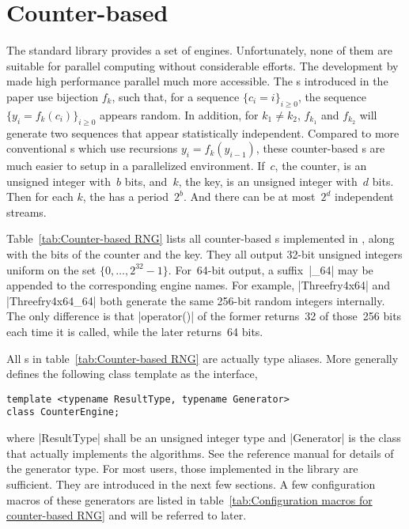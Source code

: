 \section{Counter-based \texorpdfstring{\rng}{RNG}}
\label{sec:Counter-based RNG}

The standard library provides a set of \rng engines. Unfortunately, none of
them are suitable for parallel computing without considerable efforts. The
development by~\cite{Salmon:2011um} made high performance parallel \rng much
more accessible. The \rng{}s introduced in the paper use bijection $f_k$, such
that, for a sequence $\{c_i = i\}_{i\ge0}$, the sequence $\{y_i =
f_k(c_i)\}_{i\ge0}$ appears random. In addition, for $k_1 \ne k_2$, $f_{k_1}$
and $f_{k_2}$ will generate two sequences that appear statistically
independent. Compared to more conventional \rng{}s which use recursions $y_i =
f_k(y_{i - 1})$, these counter-based \rng{}s are much easier to setup in a
parallelized environment. If~$c$, the counter, is an unsigned integer with~$b$
bits, and~$k$, the key, is an unsigned integer with~$d$ bits. Then for each
$k$, the \rng has a period~$2^b$. And there can be at most~$2^d$ independent
streams.

Table~\ref{tab:Counter-based RNG} lists all counter-based \rng{}s implemented
in \mckl, along with the bits of the counter and the key. They all output
32-bit unsigned integers uniform on the set $\{0,\dots,2^{32}-1\}$. For~64-bit
output, a suffix~|_64| may be appended to the corresponding \rng engine names.
For example, |Threefry4x64| and |Threefry4x64_64| both generate the same
256-bit random integers internally. The only difference is that |operator()| of
the former returns~32 of those~256 bits each time it is called, while the later
returns~64 bits.

All \rng{}s in table~\ref{tab:Counter-based RNG} are actually type aliases.
More generally \mckl defines the following class template as the interface,
\begin{verbatim}
template <typename ResultType, typename Generator>
class CounterEngine;
\end{verbatim}
where |ResultType| shall be an unsigned integer type and |Generator| is the
class that actually implements the algorithms. See the reference manual for
details of the generator type. For most users, those implemented in the library
are sufficient. They are introduced in the next few sections. A few
configuration macros of these generators are listed in
table~\ref{tab:Configuration macros for counter-based RNG} and will be referred
to later.

